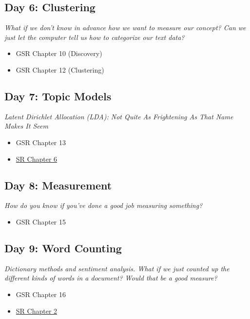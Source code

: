 \documentclass[11pt, letterpaper]{article}
\begin{document}
\subsection*{Day 6: Clustering}

\textit{What if we don't know in advance how we want to measure our concept? Can we just let the computer tell us how to categorize our text data?}

\begin{itemize}
	\item GSR Chapter 10 (Discovery)
	\item GSR Chapter 12 (Clustering)
\end{itemize}



\subsection*{Day 7: Topic Models}

\textit{Latent Dirichlet Allocation (LDA): Not Quite As Frightening As That Name Makes It Seem}

\begin{itemize}
	\item GSR Chapter 13
	\item \href{https://www.tidytextmining.com/topicmodeling.html}{SR Chapter 6}
\end{itemize}

\subsection*{Day 8: Measurement}

\textit{How do you know if you've done a good job measuring something?}

\begin{itemize}
	\item GSR Chapter 15
\end{itemize}


\subsection*{Day 9: Word Counting}

\textit{Dictionary methods and sentiment analysis. What if we just counted up the different kinds of words in a document? Would that be a good measure?}

\begin{itemize}
	\item GSR Chapter 16
	\item \href{https://www.tidytextmining.com/sentiment.html}{SR Chapter 2}
\end{itemize}
\end{document}
